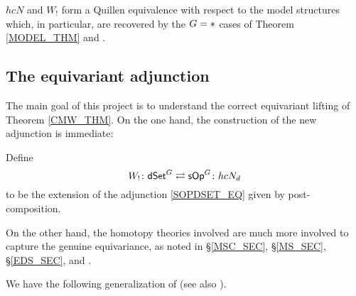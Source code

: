 \documentclass[a4paper,10pt
,draft
]{article}%
\renewcommand{\1}{\eta}%
\begin{document}
\begin{theorem}
      \label{CMW_THM}
      $hcN$ and $W_!$ form a Quillen equivalence with respect to the model structures
      which, in particular, are recovered by the $G = \**$ cases of Theorem \ref{MODEL_THM} and \cite[Thm. 2.1]{Per18}.
\end{theorem}


\subsection{The equivariant adjunction}

The main goal of this project \cite{BP_geo,BP_edss,Per18} is to understand the correct equivariant lifting of Theorem \ref{CMW_THM}.
On the one hand, the construction of the new adjunction is immediate:

\begin{definition}
      Define
      \[
            W_! \colon \mathsf{dSet}^G \rightleftarrows \mathsf{sOp}^G \colon hcN_d
      \]
      to be the
      extension of the adjunction \eqref{SOPDSET_EQ}
      given by post-composition.
\end{definition}



On the other hand, the homotopy theories involved are much more involved to capture the genuine equivariance,
as noted in \S \ref{MSC_SEC}, \S \ref{MS_SEC}, \S \ref{EDS_SEC}, and \cite{Per18}.

We have the following generalization of \cite[Prop 4.5]{CM11} (see also \cite[Prop. 6.15]{Per18}).
\end{document}

